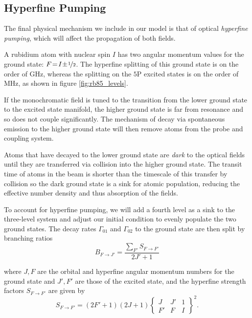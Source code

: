   \subsection{Hyperfine Pumping}

    The final physical mechanism we include in our model is that of
    optical \textit{hyperfine pumping}, which will affect the propagation of
    both fields.\cite{Razdan1999,Im2001,Nakayama1985}

    A rubidium atom with nuclear spin $I$ has two angular momentum values for
    the ground state: $F\!=\!I\!\pm\!\nicefrac{1}{2}$. The hyperfine splitting
    of this ground state is on the order of \unit{GHz}, whereas the splitting on
    the $5$P excited states is on the order of \unit{MHz}, as
    shown in figure \ref{fig:rb85_levels}.

    If the monochromatic field is tuned to the transition from the lower ground
    state to the excited state manifold, the higher ground state is far from
    resonance and so does not couple significantly. The mechanism of decay via
    spontaneous emission to the higher ground state will then remove atoms from
    the probe and coupling system.\cite{Smith2004}

    Atoms that have decayed to the lower ground state are \textit{dark} to the
    optical fields until they are transferred via collision into the higher
    ground state. The transit time of atoms in the beam is shorter than the
    timescale of this transfer by collision so the dark ground state is a sink
    for atomic population, reducing the effective number density and thus
    absorption of the fields.\cite{Sherlock2009}

    To account for hyperfine pumping, we will add a fourth level as a sink to
    the three-level system and adjust our initial condition to evenly populate
    the two ground states. The decay rates $\Gamma_{01}$ and $\Gamma_{02}$ to
    the ground state are then split by branching ratios
    \begin{equation}\label{eqn:hf_branching}
      B_{F \rightarrow J'} = \frac{\sum_{F'} S_{F \rightarrow F'}}{2J' + 1}
    \end{equation}

    where $J, F$ are the orbital and hyperfine angular momentum numbers for the
    ground state and $J', F'$ are those of the excited state, and the hyperfine
    strength factors $S_{F \rightarrow F'}$ are given by\cite{Steck2001}
    \begin{equation}\label{eqn:strength_factor}
      S_{F \rightarrow F'} = (2F' + 1)(2J + 1)
        \begin{Bmatrix}
        J & J' & 1 \\
        F' & F & I
        \end{Bmatrix}^2.
    \end{equation}

